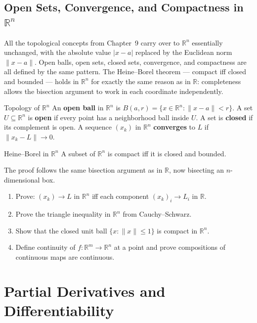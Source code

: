 \documentclass[12pt, openany]{book}
\theoremstyle{plain}
\theoremstyle{definition}
\theoremstyle{remark}
\newcommand{\R}{\mathbb{R}}
\begin{document}
\section{Open Sets, Convergence, and Compactness in \texorpdfstring{$\R^n$}{Rn}}

All the topological concepts from Chapter~9 carry over to $\R^n$ essentially unchanged, with the absolute value $|x - a|$ replaced by the Euclidean norm $\|x - a\|$.  Open balls, open sets, closed sets, convergence, and compactness are all defined by the same pattern.  The Heine--Borel theorem --- compact iff closed and bounded --- holds in $\R^n$ for exactly the same reason as in $\R$: completeness allows the bisection argument to work in each coordinate independently.

\begin{defbox}{Topology of $\R^n$}
An \textbf{open ball} in $\R^n$ is $B(a, r) = \{x \in \R^n : \|x - a\| < r\}$.
A set $U \subseteq \R^n$ is \textbf{open} if every point has a neighborhood ball inside $U$.
A set is \textbf{closed} if its complement is open.
A sequence $(x_k)$ in $\R^n$ \textbf{converges} to $L$ if $\|x_k - L\| \to 0$.
\end{defbox}
\color{black}

\begin{thmbox}{Heine--Borel in $\R^n$}
A subset of $\R^n$ is compact iff it is closed and bounded.
\end{thmbox}
\color{black}

The proof follows the same bisection argument as in $\R$, now bisecting an $n$-dimensional box.

\begin{exbox}
\begin{enumerate}
  \item Prove: $(x_k) \to L$ in $\R^n$ iff each component $(x_k)_i \to L_i$ in $\R$.
  \item Prove the triangle inequality in $\R^n$ from Cauchy--Schwarz.
  \item Show that the closed unit ball $\{x : \|x\| \leq 1\}$ is compact in $\R^n$.
  \item Define continuity of $f : \R^m \to \R^n$ at a point and prove compositions of continuous maps are continuous.
\end{enumerate}
\end{exbox}
\color{black}

\chapter{Partial Derivatives and Differentiability}
\color{black}
\end{document}

